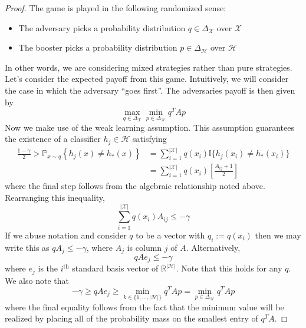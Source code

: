 \documentclass[12pt]{article}
\newcommand*{\abs}[1]{\left\lvert#1\right\rvert}
\newcommand{\R}{\mathcal{R}}
\newcommand{\Prob}{\mathbb{P}}
\def\R{\mathbb{R}}
\begin{document}
\begin{proof}
The game is played in the following randomized sense: 
\begin{itemize}
\item The adversary picks a probability distribution $q \in \Delta_{\mathcal{X}}$ over $\mathcal{X}$
\item The booster picks a probability distribution $p \in \Delta_{\mathcal{H}}$ over $\mathcal{H}$
\end{itemize}
In other words, we are considering mixed strategies rather than pure strategies. Let's consider the expected payoff from this game. Intuitively, we will consider the case in which the 
adversary ``goes first''. The adversaries payoff is then given by 
\[\max_{q \in \Delta_{\mathcal{X}}} \min_{p \in \Delta_\mathcal{H}} q^T A p\]
Now we make use of the weak learning assumption. This assumption guarantees the existence of a classifier $h_j \in \mathcal{H}$ satisfying 
\begin{align*}
\frac{1 - \gamma}{2} > \Prob_{x \sim q}\left\{h_j(x) \neq h_*(x) \right\} &= \sum_{i = 1}^{\abs{\mathcal{X}}} q(x_i) \mathbb{I}\{h_j(x_i) \neq h_*(x_i)\} \\
												  	& = \sum_{i = 1}^{\abs{\mathcal{X}}} q(x_i) \left[\frac{A_{ij} + 1}{2}\right]
\end{align*}
where the final step follows from the algebraic relationship noted above. Rearranging this inequality, 
\[\sum_{i = 1}^{\abs{\mathcal{X}}} q(x_i)A_{ij} \leq -\gamma \]
If we abuse notation and consider $q$ to be a vector with $q_i := q(x_i)$ then we may write this as $qA_j \leq -\gamma$, where $A_j$ is column $j$ of $A$. Alternatively, 
\[qAe_j \leq -\gamma\]
where $e_j$ is the $i^{\text{th}}$ standard basis vector of $\R^{\abs{\mathcal{H}}}$. Note that this holds for any $q$. We also note that 
\[ -\gamma \geq qA e_j \geq \min_{k \in \{1, \dots, \abs{\mathcal{H}}\}} q^T A p = \min_{p \in \Delta_{\mathcal{H}}} q^T A p\]
where the final equality follows from the fact that the minimum value will be realized by placing all of the probability mass on the smallest entry of $q^T A$. 


\end{proof}
\end{document}
